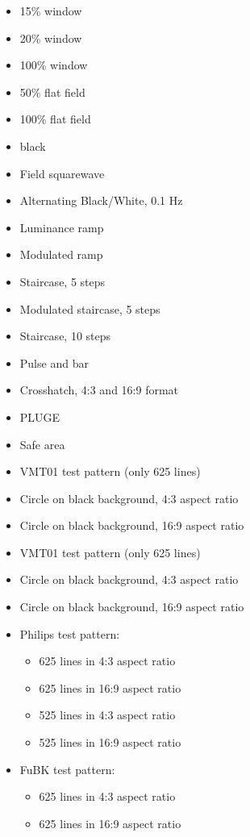 \begin{itemize}
\item 15\% window
\item 20\% window
\item 100\% window
\item 50\% flat field
\item 100\% flat field
\item black
\item Field squarewave
\item Alternating Black/White, 0.1 Hz
\item Luminance ramp
\item Modulated ramp
\item Staircase, 5 steps
\item Modulated staircase, 5 steps
\item Staircase, 10 steps
\item Pulse and bar
\item Crosshatch, 4:3 and 16:9 format
\item PLUGE
\item Safe area
\item VMT01 test pattern (only 625 lines)
\item Circle on black background, 4:3 aspect ratio
\item Circle on black background, 16:9 aspect ratio
\item VMT01 test pattern (only 625 lines)
\item Circle on black background, 4:3 aspect ratio
\item Circle on black background, 16:9 aspect ratio
\item Philips test pattern:
\begin{itemize}
\item 625 lines in 4:3 aspect ratio
\item 625 lines in 16:9 aspect ratio
\item 525 lines in 4:3 aspect ratio
\item 525 lines in 16:9 aspect ratio
\end{itemize}
\item FuBK test pattern:
\begin{itemize}
\item 625 lines in 4:3 aspect ratio
\item 625 lines in 16:9 aspect ratio
\end{itemize}
\end{itemize}


